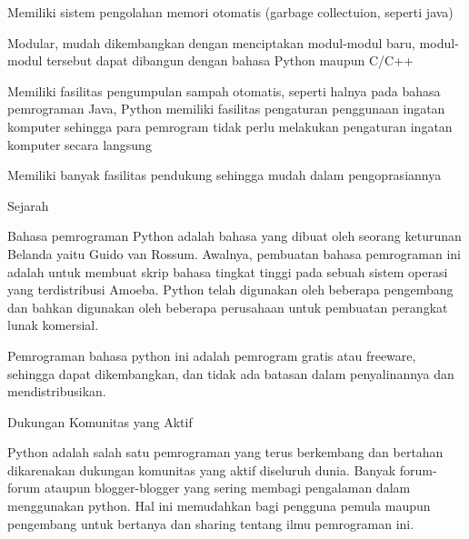 \vspace{14pt}
\noindent 
{\fontsize{14pt}{14pt}\selectfont Memiliki sistem pengolahan memori otomatis (garbage collectuion, seperti java) \\} \par
\noindent 
{\fontsize{14pt}{14pt}\selectfont Modular, mudah dikembangkan dengan menciptakan modul-modul baru, modul-modul tersebut dapat dibangun dengan bahasa Python maupun C/C++ \\} \par
\noindent 
{\fontsize{14pt}{14pt}\selectfont Memiliki fasilitas pengumpulan sampah otomatis, seperti halnya pada bahasa pemrograman Java, Python memiliki fasilitas pengaturan penggunaan ingatan komputer sehingga para pemrogram tidak perlu melakukan pengaturan ingatan komputer secara langsung \\} \par
\noindent 
{\fontsize{14pt}{14pt}\selectfont Memiliki banyak fasilitas pendukung sehingga mudah dalam pengoprasiannya \\} \par
\vspace{14pt}
\noindent 
{\fontsize{14pt}{14pt}\selectfont Sejarah \\} \par
\noindent 
{\fontsize{14pt}{14pt}\selectfont Bahasa pemrograman Python adalah bahasa yang dibuat oleh seorang keturunan Belanda yaitu Guido van Rossum. Awalnya, pembuatan bahasa pemrograman ini adalah untuk membuat skrip bahasa tingkat tinggi pada sebuah sistem operasi yang terdistribusi Amoeba. Python telah digunakan oleh beberapa pengembang dan bahkan digunakan oleh beberapa perusahaan untuk pembuatan perangkat lunak komersial. \\} \par
\noindent 
{\fontsize{14pt}{14pt}\selectfont Pemrograman bahasa python ini adalah pemrogram gratis atau freeware, sehingga dapat dikembangkan, dan tidak ada batasan dalam penyalinannya dan mendistribusikan. \\} \par
\vspace{14pt}
\noindent 
{\fontsize{14pt}{14pt}\selectfont Dukungan Komunitas yang Aktif \\} \par
\noindent 
{\fontsize{14pt}{14pt}\selectfont Python adalah salah satu pemrograman yang terus berkembang dan bertahan dikarenakan dukungan komunitas yang aktif diseluruh dunia. Banyak forum-forum ataupun blogger-blogger yang sering membagi pengalaman dalam menggunakan python. Hal ini memudahkan bagi pengguna pemula maupun pengembang untuk bertanya dan sharing tentang ilmu pemrograman ini. \\} \par
